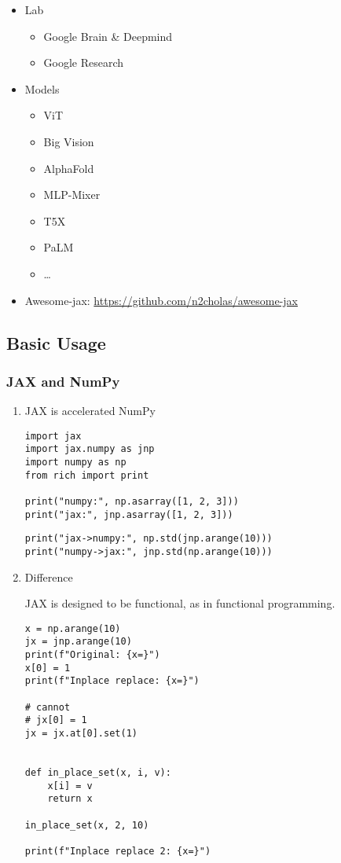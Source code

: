 \documentclass[11pt]{article}
\begin{document}
\begin{itemize}
\item Lab
\begin{itemize}
\item Google Brain \& Deepmind
\item Google Research
\end{itemize}
\item Models
\begin{itemize}
\item ViT
\item Big Vision
\item AlphaFold
\item MLP-Mixer
\item T5X
\item PaLM
\item \ldots{}
\end{itemize}
\item Awesome-jax: \url{https://github.com/n2cholas/awesome-jax}
\end{itemize}
\subsection{Basic Usage}
\label{sec:org09dd7e7}

\subsubsection{JAX and NumPy}
\label{sec:orgfad4f47}

\begin{enumerate}
\item JAX is accelerated NumPy
\label{sec:org9960215}

\begin{verbatim}
import jax
import jax.numpy as jnp
import numpy as np
from rich import print

print("numpy:", np.asarray([1, 2, 3]))
print("jax:", jnp.asarray([1, 2, 3]))
\end{verbatim}

\begin{verbatim}
print("jax->numpy:", np.std(jnp.arange(10)))
print("numpy->jax:", jnp.std(np.arange(10)))
\end{verbatim}
\item Difference
\label{sec:org2fd820a}

JAX is designed to be functional, as in functional programming.

\begin{verbatim}
x = np.arange(10)
jx = jnp.arange(10)
print(f"Original: {x=}")
x[0] = 1
print(f"Inplace replace: {x=}")

# cannot
# jx[0] = 1
jx = jx.at[0].set(1)


def in_place_set(x, i, v):
    x[i] = v
    return x

in_place_set(x, 2, 10)

print(f"Inplace replace 2: {x=}")
\end{verbatim}
\end{enumerate}
\end{document}

